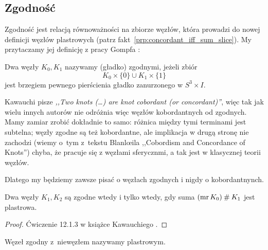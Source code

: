 
\subsection{Zgodność}
Zgodność jest relacją równoważności na zbiorze węzłów, która prowadzi do nowej definicji węzłów plastrowych (patrz fakt~\ref{prp:concordant_iff_sum_slice}).
My przytaczamy jej definicję z pracy Gompfa \cite{gompf1986}:

\begin{definition}[zgodność]
%
    Dwa węzły $K_0, K_1$ nazywamy (gładko) zgodnymi, jeżeli zbiór
    \begin{equation}
        K_0 \times \{0\} \cup K_1 \times \{1\}
    \end{equation}
    jest brzegiem pewnego pierścienia gładko zanurzonego w $S^3 \times I$.
\end{definition}

Kawauchi \cite[s. 156]{kawauchi1996} pisze \emph{,,Two knots (…) are knot cobordant (or concordant)''}, więc tak jak wielu innych autorów nie odróżnia więc węzłów kobordantnych od zgodnych.
Mamy zamiar zrobić dokładnie to samo: różnica między tymi terminami jest subtelna; węzły zgodne są też kobordantne, ale implikacja w drugą stronę nie zachodzi (wiemy o~tym z~tekstu Blanlœila ,,Cobordism and Concordance of Knots'') chyba, że pracuje się z węzłami sferycznmi, a tak jest w klasycznej teorii węzłów.
%

Dlatego my będziemy zawsze pisać o węzłach zgodnych i nigdy o kobordantnynch.

\begin{proposition}
\label{prp:concordant_iff_sum_slice}%
    Dwa węzły $K_1, K_2$ są zgodne wtedy i tylko wtedy, gdy suma $(\operatorname{mr} K_0) \mathbin{\#} K_1$ jest plastrowa.
%
%
\end{proposition}

\begin{proof}
    Ćwiczenie 12.1.3 w książce Kawauchiego \cite{kawauchi1996}.
\end{proof}

\begin{definition}
    Węzeł zgodny z~niewęzłem nazywamy plastrowym.
%
\end{definition}

